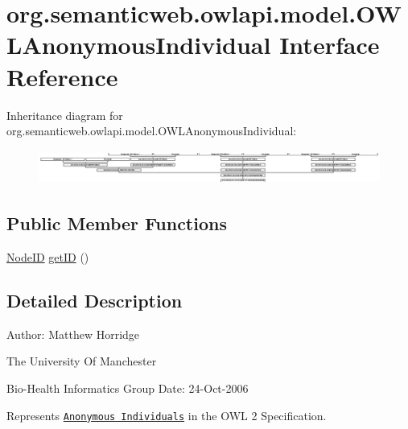 \hypertarget{interfaceorg_1_1semanticweb_1_1owlapi_1_1model_1_1_o_w_l_anonymous_individual}{\section{org.\-semanticweb.\-owlapi.\-model.\-O\-W\-L\-Anonymous\-Individual Interface Reference}
\label{interfaceorg_1_1semanticweb_1_1owlapi_1_1model_1_1_o_w_l_anonymous_individual}
}
Inheritance diagram for org.\-semanticweb.\-owlapi.\-model.\-O\-W\-L\-Anonymous\-Individual\-:\begin{figure}[H]
\begin{center}
\leavevmode
\includegraphics[height=1.122995cm]{interfaceorg_1_1semanticweb_1_1owlapi_1_1model_1_1_o_w_l_anonymous_individual}
\end{center}
\end{figure}
\subsection*{Public Member Functions}
\begin{DoxyCompactItemize}
\item 
\hyperlink{classorg_1_1semanticweb_1_1owlapi_1_1model_1_1_node_i_d}{Node\-I\-D} \hyperlink{interfaceorg_1_1semanticweb_1_1owlapi_1_1model_1_1_o_w_l_anonymous_individual_a7d2f28bd1a726ddd3e60325bb5ac5343}{get\-I\-D} ()
\end{DoxyCompactItemize}


\subsection{Detailed Description}
Author\-: Matthew Horridge\par
 The University Of Manchester\par
 Bio-\/\-Health Informatics Group Date\-: 24-\/\-Oct-\/2006 

Represents \href{http://www.w3.org/TR/2009/REC-owl2-syntax-20091027/#Anonymous_Individuals}{\tt Anonymous Individuals} in the O\-W\-L 2 Specification. 

